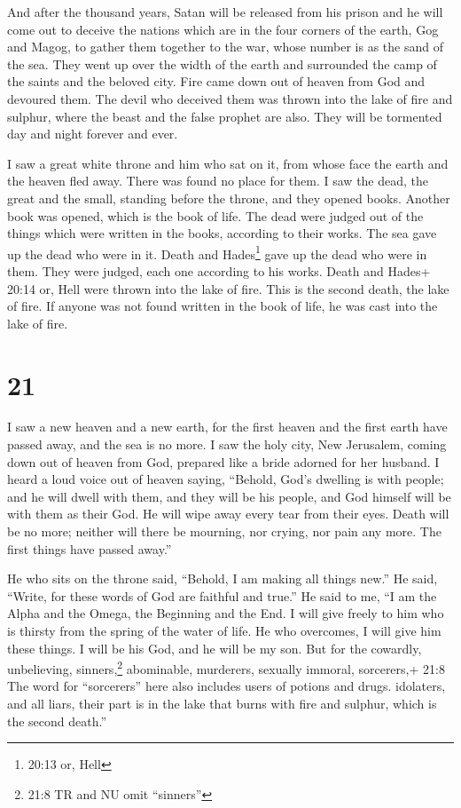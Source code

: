  And after the thousand years, Satan will be released from
his prison  and he will come out to deceive the nations
which are in the four corners of the earth, Gog and Magog, to gather
them together to the war, whose number is as the sand of the sea.
 They went up over the width of the earth and surrounded the
camp of the saints and the beloved city. Fire came down out of heaven
from God and devoured them.  The devil who deceived them
was thrown into the lake of fire and sulphur, where the beast and the
false prophet are also. They will be tormented day and night forever and
ever.

 I saw a great white throne and him who sat on it, from
whose face the earth and the heaven fled away. There was found no place
for them.  I saw the dead, the great and the small,
standing before the throne, and they opened books. Another book was
opened, which is the book of life. The dead were judged out of the
things which were written in the books, according to their works.
 The sea gave up the dead who were in it. Death and
Hades\footnote{20:13 or, Hell} gave up the dead who were in them. They
were judged, each one according to his works.  Death and
Hades+ 20:14 or, Hell were thrown into the lake of fire. This is the
second death, the lake of fire.  If anyone was not found
written in the book of life, he was cast into the lake of fire.

\hypertarget{section-20}{%
\section{21}\label{section-20}}

 I saw a new heaven and a new earth, for the first heaven
and the first earth have passed away, and the sea is no more.
 I saw the holy city, New Jerusalem, coming down out of
heaven from God, prepared like a bride adorned for her husband.
 I heard a loud voice out of heaven saying, ``Behold, God's
dwelling is with people; and he will dwell with them, and they will be
his people, and God himself will be with them as their God. 
He will wipe away every tear from their eyes. Death will be no more;
neither will there be mourning, nor crying, nor pain any more. The first
things have passed away.''

 He who sits on the throne said, ``Behold, I am making all
things new.'' He said, ``Write, for these words of God are faithful and
true.''  He said to me, ``I am the Alpha and the Omega, the
Beginning and the End. I will give freely to him who is thirsty from the
spring of the water of life.  He who overcomes, I will give
him these things. I will be his God, and he will be my son. 
But for the cowardly, unbelieving, sinners,\footnote{21:8 TR and NU omit
  ``sinners''} abominable, murderers, sexually immoral, sorcerers,+ 21:8
The word for ``sorcerers'' here also includes users of potions and
drugs. idolaters, and all liars, their part is in the lake that burns
with fire and sulphur, which is the second death.''

